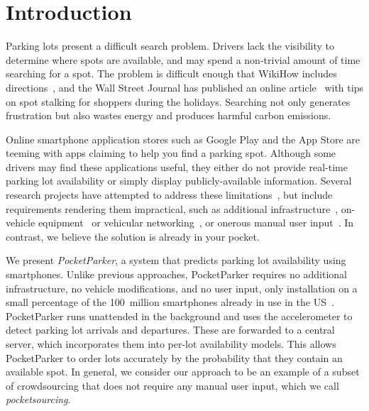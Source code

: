 \section{Introduction}


Parking lots present a difficult search problem. Drivers lack the visibility
to determine where spots are available, and may spend a non-trivial amount of
time searching for a spot. The problem is difficult enough that WikiHow
includes directions~\cite{wikihow-park}, and the Wall Street Journal has
published an online article~\cite{wsj-park} with tips on spot stalking for
shoppers during the holidays. Searching not only generates frustration but
also wastes energy and produces harmful carbon emissions.

Online smartphone application stores such as Google Play and the App Store
are teeming with apps claiming to help you find a parking spot. Although some
drivers may find these applications useful, they either do not provide
real-time parking lot availability or simply display publicly-available
information. Several research projects have attempted to address these
limitations~\cite{4212497, Chen:2012:COS, Delot:2009:CRP, 5062057,
Mathur:2010:PDS}, but include requirements rendering them impractical, such
as additional infrastructure~\cite{5062057}, on-vehicle
equipment~\cite{Mathur:2010:PDS} or vehicular
networking~\cite{Delot:2009:CRP, Mathur:2010:PDS}, or onerous manual user
input~\cite{Chen:2012:COS}. In contrast, we believe the solution is already
in your pocket.

We present \textit{PocketParker}, a system that predicts parking lot
availability using smartphones. Unlike previous approaches, PocketParker
requires no additional infrastructure, no vehicle modifications, and no user
input, only installation on a small percentage of the 100~million smartphones
already in use in the US~\cite{smartphone-numbers}. PocketParker runs
unattended in the background and uses the accelerometer to detect parking lot
arrivals and departures.  These are forwarded to a central server, which
incorporates them into per-lot availability models.  This allows PocketParker
to order lots accurately by the probability that they contain an available
spot.  In general, we consider our approach to be an example of a subset of
crowdsourcing that does not require any manual user input, which we call
\textit{pocketsourcing}.

